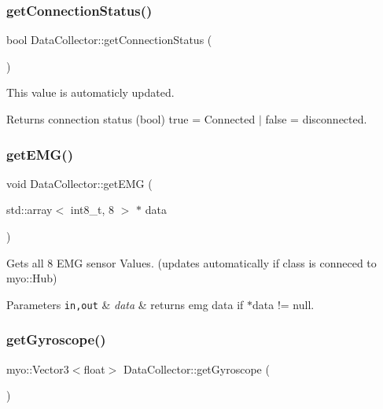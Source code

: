 \subsubsection{get\+Connection\+Status()}
{\footnotesize\ttfamily bool Data\+Collector\+::get\+Connection\+Status (\begin{DoxyParamCaption}{ }\end{DoxyParamCaption})\hspace{0.3cm}{\ttfamily [inline]}}



This value is automaticly updated. 

\begin{DoxyReturn}{Returns}
connection status (bool) true = Connected $\vert$ false = disconnected. 
\end{DoxyReturn}
\mbox{\label{class_data_collector_a6994bc51d1e7cbcaeca954a4ba7f8103}} 
\subsubsection{get\+E\+M\+G()}
{\footnotesize\ttfamily void Data\+Collector\+::get\+E\+MG (\begin{DoxyParamCaption}\item[{std\+::array$<$ int8\+\_\+t, 8 $>$ $\ast$}]{data }\end{DoxyParamCaption})\hspace{0.3cm}{\ttfamily [inline]}}



Gets all 8 E\+MG sensor Values. (updates automatically if class is conneced to myo\+::\+Hub) 


\begin{DoxyParams}[1]{Parameters}
\mbox{\tt in,out}  & {\em data} & returns emg data if $\ast$data != null. \\
\hline
\end{DoxyParams}
\mbox{\label{class_data_collector_a04ad19d96b8574ff7c9f945cd1c5ddc6}} 
\subsubsection{get\+Gyroscope()}
{\footnotesize\ttfamily myo\+::\+Vector3$<$float$>$ Data\+Collector\+::get\+Gyroscope (\begin{DoxyParamCaption}{ }\end{DoxyParamCaption})\hspace{0.3cm}{\ttfamily [inline]}}




